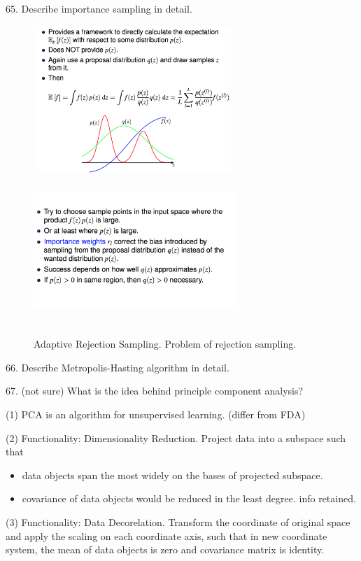 \documentclass[11pt,a4paper]{article}
\begin{document}
65. Describe importance sampling in detail.
\begin{figure}[H] \centering
    \includegraphics[width=3in,height=2.2in]{./figure/importanceSampling_1.png}
    \includegraphics[width=3in,height=2.2in]{./figure/importanceSampling_2.png}
    \caption{Adaptive Rejection Sampling. Problem of rejection sampling.}
\end{figure}

66. Describe Metropolis-Hasting algorithm in detail.

67. (not sure) What is the idea behind principle component analysis?

(1) PCA is an algorithm for unsupervised learning. (differ from FDA)

(2) Functionality: Dimensionality Reduction. Project data into a subspace such that 
\begin{itemize}
    \item data objects span the most widely on the bases of projected subspace.
    \item covariance of data objects would be reduced in the least degree. info retained.
\end{itemize}

(3) Functionality: Data Decorelation. Transform the coordinate of original space and apply the scaling on each coordinate axis, such that in new coordinate system, the mean of data objects is zero and covariance matrix is identity.
\end{document}
